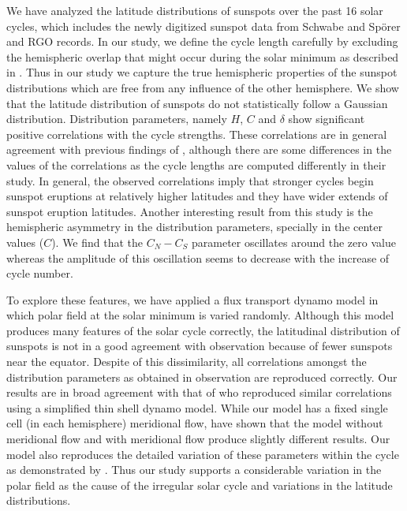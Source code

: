 \documentclass[preprint2,times,tighten]{aastex61}
\begin{document}
We have analyzed the latitude distributions of sunspots 
over the past 16 solar cycles, which includes the newly digitized sunspot data from Schwabe and Sp{\"o}rer and RGO records. 
In our study, we define the cycle length carefully by excluding the hemispheric overlap that might occur during the solar minimum as described in \citet{CS16}. Thus in our study we capture the true hemispheric properties of the sunspot distributions which are free from any influence of the other hemisphere.
We show that the latitude distribution of sunspots do not statistically follow a Gaussian distribution. Distribution parameters, namely
$H$, $C$ and $\delta$ show significant positive correlations with the cycle strengths. 
These correlations are in general agreement with previous findings of \citet{2008A&A...483..623S},
although there are some differences in the values of the correlations as the cycle lengths are computed
differently in their study.
In general, the observed correlations imply that stronger cycles begin sunspot eruptions 
at relatively higher latitudes and they have wider extends of sunspot eruption latitudes.
Another interesting result from this study is the hemispheric asymmetry in the distribution parameters, specially in the center values ($C$). We find that the $C_N-C_S$ parameter oscillates around the zero value whereas the amplitude of this oscillation seems to decrease with the increase of cycle number.


To explore these features, we have applied a flux transport dynamo model
in which polar field at the solar minimum is varied randomly.
Although this model produces many features of the solar cycle correctly, the latitudinal distribution
of sunspots is not in a good agreement with observation because of fewer sunspots near the equator.
Despite of this dissimilarity, all correlations amongst the distribution parameters as obtained in observation are reproduced correctly. 
Our results are in broad agreement with that of \citet{2008A&A...483..623S} who reproduced similar correlations 
using a simplified thin shell dynamo model. While our model has a fixed single cell (in each hemisphere) meridional flow, \citet{2008A&A...483..623S} have shown that
the model without meridional flow and with meridional flow
produce slightly different results.
Our model also reproduces the detailed variation of these parameters within the cycle as demonstrated by \citet{CS16}. Thus our study supports a considerable variation in the polar field as the cause of the irregular solar cycle and variations in the latitude distributions. 
\end{document}
